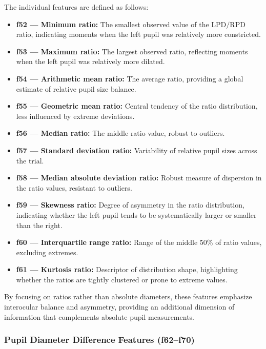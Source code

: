 \documentclass{article}
\begin{document}
The individual features are defined as follows:

\begin{itemize}
    \item \textbf{f52 — Minimum ratio:} The smallest observed value of the \(\mathrm{LPD}/\mathrm{RPD}\) ratio, indicating moments when the left pupil was relatively more constricted.
    \item \textbf{f53 — Maximum ratio:} The largest observed ratio, reflecting moments when the left pupil was relatively more dilated.
    \item \textbf{f54 — Arithmetic mean ratio:} The average ratio, providing a global estimate of relative pupil size balance.
    \item \textbf{f55 — Geometric mean ratio:} Central tendency of the ratio distribution, less influenced by extreme deviations.
    \item \textbf{f56 — Median ratio:} The middle ratio value, robust to outliers.
    \item \textbf{f57 — Standard deviation ratio:} Variability of relative pupil sizes across the trial.
    \item \textbf{f58 — Median absolute deviation ratio:} Robust measure of dispersion in the ratio values, resistant to outliers.
    \item \textbf{f59 — Skewness ratio:} Degree of asymmetry in the ratio distribution, indicating whether the left pupil tends to be systematically larger or smaller than the right.
    \item \textbf{f60 — Interquartile range ratio:} Range of the middle 50\% of ratio values, excluding extremes.
    \item \textbf{f61 — Kurtosis ratio:} Descriptor of distribution shape, highlighting whether the ratios are tightly clustered or prone to extreme values.
\end{itemize}

By focusing on ratios rather than absolute diameters, these features emphasize interocular balance and asymmetry, providing an additional dimension of information that complements absolute pupil measurements.

\subsubsection{Pupil Diameter Difference Features (f62–f70)}
\end{document}
